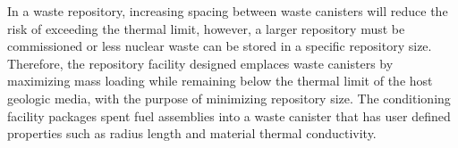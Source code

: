 \documentclass{anstrans}
\begin{document}
In a waste repository, increasing spacing between waste canisters will reduce 
the risk of exceeding the thermal limit, however, a larger repository must be 
commissioned or less nuclear waste can be stored in a specific repository size. 
Therefore, the repository facility designed emplaces waste canisters by 
maximizing mass loading while remaining below the thermal limit of the 
host geologic media, with the purpose of minimizing repository size. 
The conditioning facility packages spent fuel assemblies into a waste canister 
that has user defined properties such as radius length and material thermal 
conductivity. 








\end{document}
